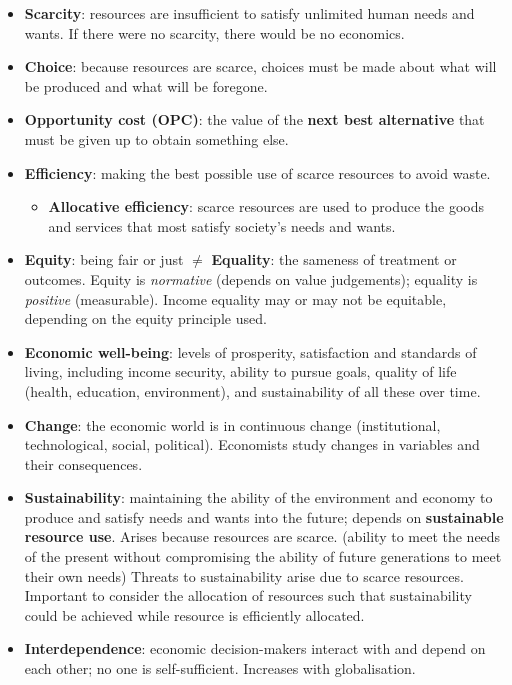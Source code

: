 \begin{itemize}
  \item \textbf{Scarcity}: resources are insufficient to satisfy unlimited human needs and wants. If there were no scarcity, there would be no economics.
  \item \textbf{Choice}: because resources are scarce, choices must be made about what will be produced and what will be foregone.
  \item \textbf{Opportunity cost (OPC)}: the value of the \textbf{next best alternative} that must be given up to obtain something else.
  \item \textbf{Efficiency}: making the best possible use of scarce resources to avoid waste.
  \begin{itemize}
    \item \textbf{Allocative efficiency}: scarce resources are used to produce the goods and services that most satisfy society's needs and wants.
  \end{itemize}
  \item \textbf{Equity}: being fair or just $\neq$ \textbf{Equality}: the sameness of treatment or outcomes. Equity is \textit{normative} (depends on value judgements); equality is \textit{positive} (measurable). Income equality may or may not be equitable, depending on the equity principle used.
  \item \textbf{Economic well-being}: levels of prosperity, satisfaction and standards of living, including income security, ability to pursue goals, quality of life (health, education, environment), and sustainability of all these over time.
  \item \textbf{Change}: the economic world is in continuous change (institutional, technological, social, political). Economists study changes in variables and their consequences.
  \item \textbf{Sustainability}: maintaining the ability of the environment and economy to produce and satisfy needs and wants into the future; depends on \textbf{sustainable resource use}. Arises because resources are scarce. (ability to meet the needs of the present without compromising the ability of future generations to meet their own needs) Threats to sustainability arise due to scarce resources. Important to consider the allocation of resources such that sustainability could be achieved while resource is efficiently allocated.
  \item \textbf{Interdependence}: economic decision-makers interact with and depend on each other; no one is self-sufficient. Increases with globalisation.

\end{itemize}
